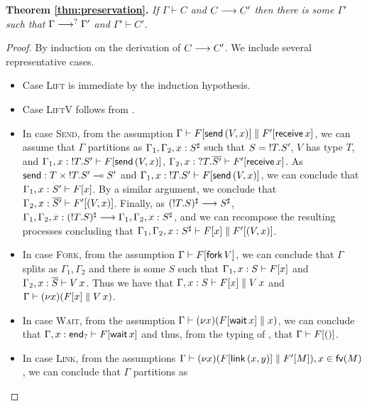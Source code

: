 \documentclass[oribibl,orivec,envcountsame]{llncs}
\begin{document}
\noindent
\textbf{Theorem \ref{thm:preservation}.}
\textit{If $\Gamma \vdash C$ and $C \longrightarrow C'$ then there is some $\Gamma'$ such that $\Gamma
  \longrightarrow^?  \Gamma'$ and $\Gamma' \vdash C'$.}

\begin{proof}
  By induction on the derivation of $C \longrightarrow C'$.  We include several representative cases.
  \begin{itemize}
  \item Case \textsc{Lift} is immediate by the induction hypothesis.
  \item Case \textsc{LiftV} follows from .
  \item In case \textsc{Send}, from the assumption $\Gamma \vdash F[\mathsf{send}\,(V,x)] \parallel
    F'[\mathsf{receive} \, x]$, we can assume that $\Gamma$ partitions as
    $\Gamma_1,\Gamma_2,x:S^\sharp$ such that $S = {!T.S'}$, $V$ has type $T$, and
    $\Gamma_1,x:{!T.S'} \vdash F[\mathsf{send} \, (V,x)]$,
    $\Gamma_2,x:{?T.\overline{S'}} \vdash F'[\mathsf{receive} \, x]$.  As $\mathsf{send} : T
    \times {!T.S'} \multimap S'$ and $\Gamma_1,x:{!T.S'} \vdash F[\mathsf{send} \,
    (V,x)]$, we can conclude that $\Gamma_1,x:S' \vdash F[x]$.  By a similar argument, we conclude
    that $\Gamma_2,x:\overline{S'} \vdash F'[(V,x)]$. Finally, as $({!T.S})^\sharp \longrightarrow
    S^\sharp$, $\Gamma_1,\Gamma_2,x:({!T.S})^\sharp \longrightarrow
    \Gamma_1,\Gamma_2,x:S^\sharp$, and we can recompose the resulting processes concluding that
    $\Gamma_1,\Gamma_2,x:S^\sharp \vdash F[x] \parallel F'[(V,x)]$.
  \item In case \textsc{Fork}, from the assumption $\Gamma \vdash F[\mathsf{fork} \, V]$, we
    can conclude that $\Gamma$ splits as $\Gamma_1,\Gamma_2$ and there is some $S$ such that
    $\Gamma_1,x:S \vdash F[x]$ and $\Gamma_2,x:\overline{S} \vdash V \, x$.  Thus we have that
    $\Gamma,x:S \vdash F[x] \parallel V \, x$ and $\Gamma \vdash (\nu x)(F[x] \parallel V \,
    x)$.
  \item In case \textsc{Wait}, from the assumption $\Gamma \vdash (\nu x)(F[\mathsf{wait} \,
    x] \parallel x)$, we can conclude that $\Gamma,x:\mathsf{end}_? \vdash F[\mathsf{wait} \, x]$ and
    thus, from the typing of , that $\Gamma \vdash F[()]$.
  \item In case \textsc{Link}, from the assumptions $\Gamma \vdash (\nu x) (F[\mathsf{link} \,
    (x, y)] \parallel F'[M]), x \in \mathsf{fv}(M)$, we can conclude that $\Gamma$ partitions as

\end{itemize}
\end{proof}
\end{document}
